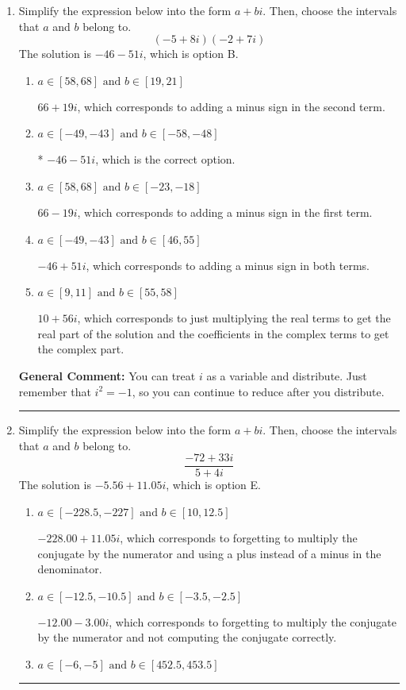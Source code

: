 \documentclass{extbook}[14pt]
\newcommand{\litem}[1]{\item #1

\rule{\textwidth}{0.4pt}}
\begin{document}
\begin{enumerate}\litem{
Simplify the expression below into the form $a+bi$. Then, choose the intervals that $a$ and $b$ belong to.
\[ (-5 + 8 i)(-2 + 7 i) \]The solution is \( -46 - 51 i \), which is option B.\begin{enumerate}[label=\Alph*.]
\item \( a \in [58, 68] \text{ and } b \in [19, 21] \)

 $66 + 19 i$, which corresponds to adding a minus sign in the second term.
\item \( a \in [-49, -43] \text{ and } b \in [-58, -48] \)

* $-46 - 51 i$, which is the correct option.
\item \( a \in [58, 68] \text{ and } b \in [-23, -18] \)

 $66 - 19 i$, which corresponds to adding a minus sign in the first term.
\item \( a \in [-49, -43] \text{ and } b \in [46, 55] \)

 $-46 + 51 i$, which corresponds to adding a minus sign in both terms.
\item \( a \in [9, 11] \text{ and } b \in [55, 58] \)

 $10 + 56 i$, which corresponds to just multiplying the real terms to get the real part of the solution and the coefficients in the complex terms to get the complex part.
\end{enumerate}

\textbf{General Comment:} You can treat $i$ as a variable and distribute. Just remember that $i^2=-1$, so you can continue to reduce after you distribute.
}
\litem{
Simplify the expression below into the form $a+bi$. Then, choose the intervals that $a$ and $b$ belong to.
\[ \frac{-72 + 33 i}{5 + 4 i} \]The solution is \( -5.56  + 11.05 i \), which is option E.\begin{enumerate}[label=\Alph*.]
\item \( a \in [-228.5, -227] \text{ and } b \in [10, 12.5] \)

 $-228.00  + 11.05 i$, which corresponds to forgetting to multiply the conjugate by the numerator and using a plus instead of a minus in the denominator.
\item \( a \in [-12.5, -10.5] \text{ and } b \in [-3.5, -2.5] \)

 $-12.00  - 3.00 i$, which corresponds to forgetting to multiply the conjugate by the numerator and not computing the conjugate correctly.
\item \( a \in [-6, -5] \text{ and } b \in [452.5, 453.5] \)


\end{enumerate}}
\end{enumerate}
\end{document}
